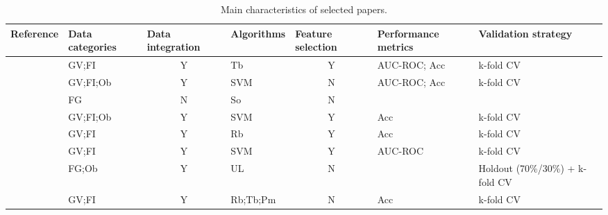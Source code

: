 \begin{landscape}

\begin{table}[!th]
\caption{Main characteristics of selected papers. \label{tab:selectedPapers}}
\centering
 \begin{adjustbox}{scale=0.7,center}
\begin{tabular}{llclcll}
\hline
Reference                   & Data categories      & \multicolumn{1}{l}{Data integration} & Algorithms       & \multicolumn{1}{l}{Feature selection} & Performance metrics             & Validation strategy          \\ \hline
\citet{Carter2009}        & GV;FI          & Y                                    & Tb              & Y                                     & AUC-ROC; Acc                       & k-fold CV                       \\
\citet{Capriotti2011} & GV;FI;Ob       & Y                                    & SVM             & N                                     & AUC-ROC; Acc                        & k-fold CV                       \\
\citet{Fu2012}            & FG             & N                                    & So              & N                                     &                                 &                                 \\
\citet{Tan2012}           & GV;FI;Ob             & Y                                    & SVM             & Y                                     & Acc                             & k-fold CV                       \\
\citet{Davoli2013}        & GV;FI          & Y                                    & Rb              & Y                                     & Acc                             & k-fold CV                       \\
\citet{Mao2013}           & GV;FI          & Y                                    & SVM             & Y                                     & AUC-ROC                             & k-fold CV                       \\
\citet{Manolakos2014}     & FG;Ob             & Y                                    & UL              & N                                     &                                 & Holdout (70\%/30\%) + k-fold CV \\
\citet{Schroeder2014}     & GV;FI          & Y                                    & Rb;Tb;Pm        & N                                     & Acc                             & k-fold CV                       \\

\end{tabular}
\end{adjustbox}
\end{table}
\end{landscape}
